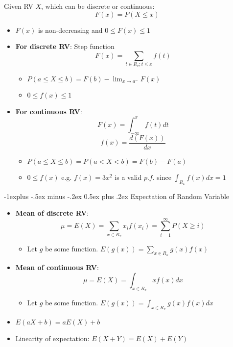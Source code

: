 \documentclass{article}
\makeatletter
\renewcommand{\subsection}{\@startsection{subsection}{2}{0mm}%
    {-1explus -.5ex minus -.2ex}%
    {0.5ex plus .2ex}%
{\normalfont\normalsize\bfseries}}
\makeatother
\begin{document}
\begin{multicols*}{3}
Given RV $X$, which can be discrete or continuous:
\[F(x) = P(X \leq x)\]

\begin{itemize}
    \item $F(x)$ is non-decreasing and $0 \leq F(x) \leq 1$
    \item \textbf{For discrete RV}: Step function
    \[F(x) = \sum _{t \in R_x; t \leq x} f(t)\]
    \begin{itemize}
        \item $P(a \leq X \leq b) = F(b) - \lim _{x \to a^-} F(x)$
        \item $0 \leq f(x) \leq 1$
    \end{itemize}

    \item \textbf{For continuous RV}:
    \[F(x) = \int _{-\infty} ^{x} f(t) dt\]
    \[f(x) = \frac{d(F(x))}{dx}\]
    \begin{itemize}
        \item $P(a \leq X \leq b) = P(a < X < b) = F(b) - F(a)$
        \item $0 \leq f(x)$ e.g. $f(x) = 3x^2$ is a valid $p.f.$ since $\int _{R_x} f(x) dx = 1$
    \end{itemize}
\end{itemize}

\subsection{Expectation of Random Variable}

\begin{itemize}
    \item \textbf{Mean of discrete RV}: 
    \[\mu = E(X) = \sum _{x \in R_x} x_i f(x_i) = \sum _{i=1} ^{\infty} P(X \geq i)\]
    \begin{itemize}
        \item Let $g$ be some function. $E(g(x)) = \sum _{x \in R_x} g(x)f(x)$
    \end{itemize}
    \item \textbf{Mean of continuous RV}: 
    \[\mu = E(X) = \int _{x \in R_x} x f(x) dx\]
    \begin{itemize}
        \item Let $g$ be some function. $E(g(x)) = \int _{x \in R_x} g(x)f(x)dx$
    \end{itemize}
    \item $E(aX + b) = aE(X) + b$
    \item Linearity of expectation: $E(X + Y) = E(X) + E(Y)$
\end{itemize}


\end{multicols*}
\end{document}
